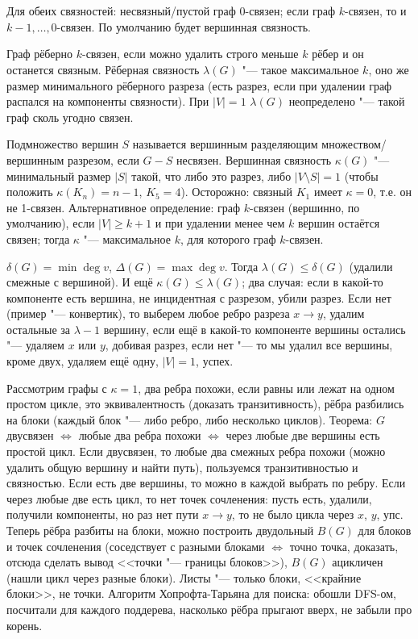 \section{} %
	Для обеих связностей:
	несвязный/пустой граф 0-связен;
	если граф $k$-связен, то и $k-1, \dots, 0$-связен.
	По умолчанию будет вершинная связность.

	Граф рёберно $k$-связен, если можно удалить строго меньше $k$ рёбер и он останется связным.
	Рёберная связность $\lambda(G)$ "--- такое максимальное $k$, оно же
	размер минимального рёберного разреза (есть разрез, если при удалении граф распался на компоненты связности).
	При $|V|=1$ $\lambda(G)$ неопределено "--- такой граф сколь угодно связен.

	Подмножество вершин $S$ называется вершинным разделяющим множеством/вершинным разрезом,
	если $G-S$ несвязен.
	Вершинная связность $\kappa(G)$ "--- минимальный размер $|S|$ такой, что либо это разрез,
	либо $|V\setminus S|=1$ (чтобы положить $\kappa(K_n)=n-1$, $K_5=4$).
	Осторожно: связный $K_1$ имеет $\kappa=0$, т.е. он не 1-связен.
	Альтернативное определение: граф $k$-связен (вершинно, по умолчанию), если $|V|\ge k+1$
	и при удалении менее чем $k$ вершин остаётся связен;
	тогда $\kappa$ "--- максимальное $k$, для которого граф $k$-связен.

	$\delta(G) = \min \deg v$, $\Delta(G) = \max\deg v$.
	Тогда $\lambda(G)\le\delta(G)$ (удалили смежные с вершиной).
	И ещё $\kappa(G)\le \lambda(G)$; два случая: если в какой-то компоненте есть вершина,
	не инцидентная с разрезом, убили разрез.
	Если нет (пример "--- конвертик), то выберем любое ребро разреза $x \to y$,
	удалим остальные за $\lambda-1$ вершину, если ещё в какой-то компоненте вершины остались "--- удаляем $x$ или $y$, добивая разрез,
	если нет "--- то мы удалил все вершины, кроме двух, удаляем ещё одну, $|V|=1$, успех.

	Рассмотрим графы с $\kappa=1$, два ребра похожи, если равны или лежат на одном простом цикле,
	это эквивалентность (доказать транзитивность), рёбра разбились на блоки (каждый блок "--- либо ребро, либо несколько циклов).
	Теорема: $G$ двусвязен $\iff$ любые два ребра похожи $\iff$ через любые две вершины есть простой цикл.
	Если двусвязен, то любые два смежных ребра похожи (можно удалить общую вершину и найти путь), пользуемся транзитивностью и связностью.
	Если есть две вершины, то можно в каждой выбрать по ребру.
	Если через любые две есть цикл, то нет точек сочленения: пусть есть, удалили,
	получили компоненты, но раз нет пути $x \to y$, то не было цикла через $x$, $y$, упс.
	Теперь рёбра разбиты на блоки, можно построить двудольный $B(G)$ для блоков и точек сочленения (соседствует с разными блоками $\iff$ точно точка, доказать,
	отсюда сделать вывод <<точки "--- границы блоков>>), $B(G)$ ацикличен (нашли цикл через разные блоки).
	Листы "--- только блоки, <<крайние блоки>>, не точки.
	Алгоритм Хопрофта-Тарьяна для поиска: обошли DFS-ом, посчитали для каждого поддерева, насколько рёбра прыгают вверх, не забыли про корень.

